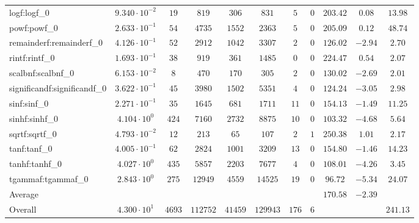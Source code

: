 \begin{tabular}{|l|c|c|c|c|c|c|c|c|c|c|}
logf:logf\_0                 & $ 9.340 \cdot 10^{-2} $ & $ 19     $ & $ 819    $ & $ 306   $ & $ 831    $ & $ 5   $ & $ 0 $ & $ 203.42      $ & $ 0.08    $ & $ 13.98   $ \\
powf:powf\_0                 & $ 2.633 \cdot 10^{-1} $ & $ 54     $ & $ 4735   $ & $ 1552  $ & $ 2363   $ & $ 5   $ & $ 0 $ & $ 205.09      $ & $ 0.12    $ & $ 48.74   $ \\
remainderf:remainderf\_0     & $ 4.126 \cdot 10^{-1} $ & $ 52     $ & $ 2912   $ & $ 1042  $ & $ 3307   $ & $ 2   $ & $ 0 $ & $ 126.02      $ & $ -2.94   $ & $ 2.70    $ \\
rintf:rintf\_0               & $ 1.693 \cdot 10^{-1} $ & $ 38     $ & $ 919    $ & $ 361   $ & $ 1485   $ & $ 0   $ & $ 0 $ & $ 224.47      $ & $ 0.54    $ & $ 2.07    $ \\
scalbnf:scalbnf\_0           & $ 6.153 \cdot 10^{-2} $ & $ 8      $ & $ 470    $ & $ 170   $ & $ 305    $ & $ 2   $ & $ 0 $ & $ 130.02      $ & $ -2.69   $ & $ 2.01    $ \\
significandf:significandf\_0 & $ 3.622 \cdot 10^{-1} $ & $ 45     $ & $ 3980   $ & $ 1502  $ & $ 5351   $ & $ 4   $ & $ 0 $ & $ 124.24      $ & $ -3.05   $ & $ 2.98    $ \\
sinf:sinf\_0                 & $ 2.271 \cdot 10^{-1} $ & $ 35     $ & $ 1645   $ & $ 681   $ & $ 1711   $ & $ 11  $ & $ 0 $ & $ 154.13      $ & $ -1.49   $ & $ 11.25   $ \\
sinhf:sinhf\_0               & $ 4.104 \cdot 10^{0}  $ & $ 424    $ & $ 7160   $ & $ 2732  $ & $ 8875   $ & $ 10  $ & $ 0 $ & $ 103.32      $ & $ -4.68   $ & $ 5.64    $ \\
sqrtf:sqrtf\_0               & $ 4.793 \cdot 10^{-2} $ & $ 12     $ & $ 213    $ & $ 65    $ & $ 107    $ & $ 2   $ & $ 1 $ & $ 250.38      $ & $ 1.01    $ & $ 2.17    $ \\
tanf:tanf\_0                 & $ 4.005 \cdot 10^{-1} $ & $ 62     $ & $ 2824   $ & $ 1001  $ & $ 3209   $ & $ 13  $ & $ 0 $ & $ 154.80      $ & $ -1.46   $ & $ 14.23   $ \\
tanhf:tanhf\_0               & $ 4.027 \cdot 10^{0}  $ & $ 435    $ & $ 5857   $ & $ 2203  $ & $ 7677   $ & $ 4   $ & $ 0 $ & $ 108.01      $ & $ -4.26   $ & $ 3.45    $ \\
tgammaf:tgammaf\_0           & $ 2.843 \cdot 10^{0}  $ & $ 275    $ & $ 12949  $ & $ 4559  $ & $ 14525  $ & $ 19  $ & $ 0 $ & $ 96.72       $ & $ -5.34   $ & $ 24.07   $ \\
\hline
Average                      & $                     $ & $        $ & $        $ & $       $ & $        $ & $     $ & $   $ & $ 170.58      $ & $ -2.39   $ & $         $ \\
\hline
Overall                      & $ 4.300 \cdot 10^{1}  $ & $ 4693   $ & $ 112752 $ & $ 41459 $ & $ 129943 $ & $ 176 $ & $ 6 $ & $             $ & $         $ & $ 241.13  $ \\
\hline
\end{tabular}
